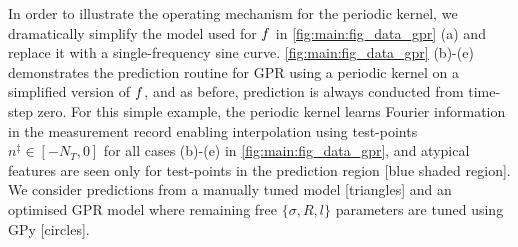 \begin{figure}
\end{figure}

In order to illustrate the operating mechanism for the periodic kernel, we dramatically simplify the model used for $f$  in  \cref{fig:main:fig_data_gpr} (a) and replace it with a single-frequency sine curve.  \cref{fig:main:fig_data_gpr} (b)-(e) demonstrates the prediction routine for GPR using a periodic kernel on a simplified version of $f$, and as before, prediction is always conducted from time-step zero. For this simple example, the periodic kernel learns Fourier information in the measurement record enabling interpolation using test-points $n^{\ddagger} \in [-N_T, 0]$ for all cases (b)-(e) in \cref{fig:main:fig_data_gpr}, and atypical features are seen only for test-points in the prediction region [blue shaded region]. We consider predictions from a manually tuned model [triangles] and an optimised GPR model where remaining free $\{\sigma, R, l \}$ parameters are tuned using GPy [circles]. 

